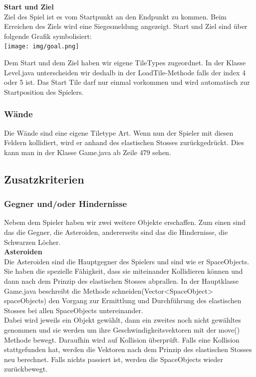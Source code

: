 \documentclass[12pt,a4paper]{scrartcl}
\begin{document}
\textbf{Start und Ziel}\\
Ziel des Spiel ist es vom Startpunkt an den Endpunkt zu kommen. Beim Erreichen des Ziels wird eine Siegesmeldung
angezeigt. Start und Ziel sind über folgende Grafik symbolisiert:\\

\texttt{[image: img/goal.png]}

Dem Start und dem Ziel haben wir eigene TileTypes zugeordnet.
In der Klasse Level.java unterscheiden wir deshalb in der LoadTile-Methode falls der index 4 oder 5 ist.
Das Start Tile darf nur einmal vorkommen und wird automatisch zur Startposition des Spielers.

\subsubsection{Wände}
Die Wände sind eine eigene Tiletype Art.
Wenn nun der Spieler mit diesen Feldern kollidiert, wird er anhand des elastischen Stosses zurückgedrückt.
Dies kann man in der Klasse Game.java ab Zeile 479 sehen.

\subsection{Zusatzkriterien}

\subsubsection{Gegner und/oder Hindernisse}

Nebem dem Spieler haben wir zwei weitere Objekte erschaffen.
Zum einen sind das die Gegner, die Asteroiden, andererseits sind das die Hindernisse, die Schwarzen Löcher.		\\

\textbf{Asteroiden}		\\
Die Asteroiden sind die Hauptgegner des Spielers und sind wie er SpaceObjects. Sie haben die spezielle Fähigkeit, dass sie miteinander Kollidieren können und dann nach dem Prinzip des elastischen Stosses abprallen.
In der Hauptklasse Game.java beschreibt die Methode schneiden(Vector<SpaceObject> spaceObjects) den Vorgang zur Ermittlung und Durchführung des elastischen Stosses bei allen SpaceObjects untereinander. \\
Dabei wird jeweils ein Objekt gewählt, dann ein zweites noch nicht gewähltes genommen und sie werden um ihre Geschwindigkeitsvektoren mit der move() Methode bewegt. 
Daraufhin wird auf Kollision überprüft.
Falls eine Kollision stattgefunden hat, werden die Vektoren nach dem Prinzip des elastischen Stosses neu berechnet.
Falls nichts passiert ist, werden die SpaceObjects wieder zurückbewegt.
\end{document}
